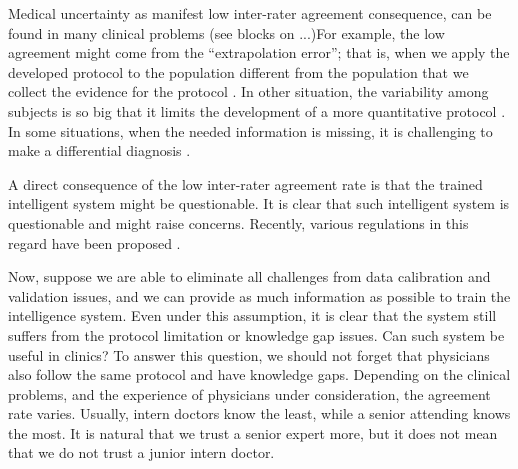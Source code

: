 \documentclass[11pt]{article}
\begin{document}


  Medical uncertainty as manifest low inter-rater agreement
  consequence, can be found in many clinical problems (see blocks on
  ...)For example, the low agreement might come from the
  ``extrapolation error''; that is, when we apply the developed
  protocol to the population different from the population that we
  collect the evidence for the protocol \cite{brosnan2015modest}.  In
  other situation, the variability among subjects is so big that it
  limits the development of a more quantitative protocol
  \cite{venhola2003interobserver}. In some situations, when the needed
  information is missing, it is challenging to make a differential
  diagnosis \cite{moncada2011reading}.

  A direct consequence of the low inter-rater agreement rate is that the trained intelligent system might be questionable. 
%  
It is clear that such intelligent system is questionable and might raise concerns. Recently, various regulations in this regard have been proposed \cite{price2014black,ford2016privacy}.


Now, suppose we are able to eliminate all challenges from data
calibration and validation issues, and we can provide as much
information as possible to train the intelligence system. Even under
this assumption, it is clear that the system still suffers from the
protocol limitation or knowledge gap issues. Can such system be useful
in clinics? To answer this question, we should not forget that
physicians also follow the same protocol and have knowledge
gaps. Depending on the clinical problems, and the experience of
physicians under consideration, the agreement rate varies. Usually,
intern doctors know the least, while a senior attending knows the
most. It is natural that we trust a senior expert more, but it does
not mean that we do not trust a junior intern doctor.
\end{document}
